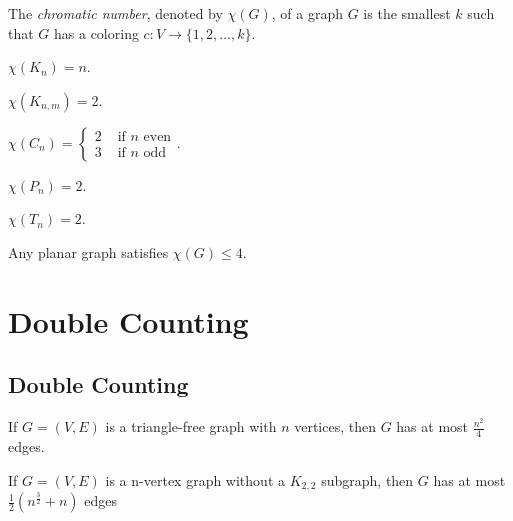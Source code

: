 \documentclass{classnotes}
\begin{document}
\begin{definition}
    The \emph{chromatic number}, denoted by $\chi(G)$, of a graph $G$ is the smallest $k$ such that $G$ has a coloring $c: V \to \{1,2,\dots,k\}$.
\end{definition}

\begin{example}
    $\chi(K_n) = n$.
\end{example}
\begin{example}
    $\chi(K_{n,m}) = 2$.
\end{example}
\begin{example}
    $\chi(C_n) = \begin{cases} 2 &\text{ if } n \text{ even}\\ 3 &\text{ if } n \text{ odd}\end{cases}. $
\end{example}
\begin{example}
    $\chi(P_n) = 2$.
\end{example}
\begin{example}
    $\chi(T_n) = 2$.
\end{example}

\begin{theorem}
    Any planar graph satisfies $\chi(G) \le 4$.
\end{theorem}

\section{Double Counting}
\subsection{Double Counting}
\begin{theorem}
    If $G=(V,E)$ is a triangle-free graph with $n$ vertices, then $G$ has at most $\frac{n^2}{4}$ edges.
\end{theorem}
\begin{theorem}
    If $G=(V,E)$ is a n-vertex graph without a $K_{2,2}$ subgraph, then $G$ has at most $\frac{1}{2}(n^{\frac{3}{2}} +n)$ edges
\end{theorem}
\end{document}
